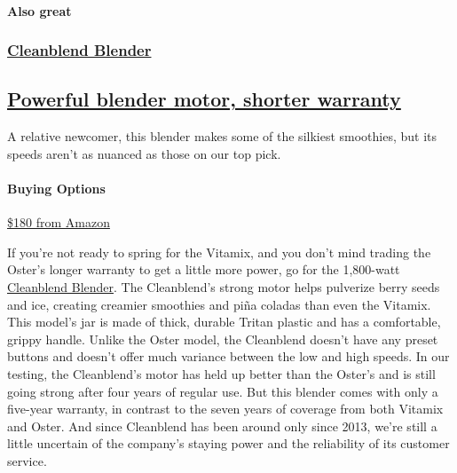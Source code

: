 \hypertarget{also-great}{%
\paragraph{Also great}\label{also-great}}

\href{https://www.nytimes3xbfgragh.onion/wirecutter/out/link/8947/25620/4/109196?merchant=Amazon}{}

\hypertarget{cleanblend-blender}{%
\subsubsection{\texorpdfstring{\href{https://www.nytimes3xbfgragh.onion/wirecutter/out/link/8947/25620/4/109196?merchant=Amazon}{Cleanblend
Blender}}{Cleanblend Blender}}\label{cleanblend-blender}}

\hypertarget{powerful-blender-motor-shorter-warranty}{%
\subsection{\texorpdfstring{\href{https://www.nytimes3xbfgragh.onion/wirecutter/out/link/8947/25620/4/109196?merchant=Amazon}{Powerful
blender motor, shorter
warranty}}{Powerful blender motor, shorter warranty}}\label{powerful-blender-motor-shorter-warranty}}

A relative newcomer, this blender makes some of the silkiest smoothies,
but its speeds aren't as nuanced as those on our top pick.

\hypertarget{buying-options-2}{%
\paragraph{Buying Options}\label{buying-options-2}}

\href{https://www.nytimes3xbfgragh.onion/wirecutter/out/link/8947/25620/4/109196?merchant=Amazon}{\$180
from Amazon}

If you're not ready to spring for the Vitamix, and you don't mind
trading the Oster's longer warranty to get a little more power, go for
the 1,800-watt
\href{https://www.nytimes3xbfgragh.onion/wirecutter/out/link/8947/25620/4/69781/?merchant=Amazon}{Cleanblend
Blender}. The Cleanblend's strong motor helps pulverize berry seeds and
ice, creating creamier smoothies and piña coladas than even the Vitamix.
This model's jar is made of thick, durable Tritan plastic and has a
comfortable, grippy handle. Unlike the Oster model, the Cleanblend
doesn't have any preset buttons and doesn't offer much variance between
the low and high speeds. In our testing, the Cleanblend's motor has held
up better than the Oster's and is still going strong after four years of
regular use. But this blender comes with only a five-year warranty, in
contrast to the seven years of coverage from both Vitamix and Oster. And
since Cleanblend has been around only since 2013, we're still a little
uncertain of the company's staying power and the reliability of its
customer service.

